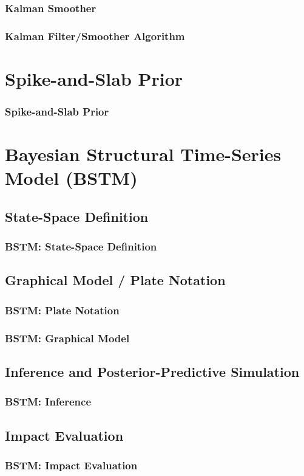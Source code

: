 \documentclass{beamer}
\begin{document}
\begin{frame}\frametitle{Kalman Smoother}

\end{frame}

\begin{frame}\frametitle{Kalman Filter/Smoother Algorithm}

\end{frame}


\section{Spike-and-Slab Prior}
\begin{frame}\frametitle{Spike-and-Slab Prior}

\end{frame}


\section{Bayesian Structural Time-Series Model (BSTM)} 
\subsection{State-Space Definition}
\begin{frame}\frametitle{BSTM: State-Space Definition}

\end{frame}

\subsection{Graphical Model / Plate Notation}
\begin{frame}\frametitle{BSTM: Plate Notation}

\end{frame}

\begin{frame}\frametitle{BSTM: Graphical Model}

\end{frame}

\subsection{Inference and Posterior-Predictive Simulation}
\begin{frame}\frametitle{BSTM: Inference}

\end{frame}

\subsection{Impact Evaluation}
\begin{frame}\frametitle{BSTM: Impact Evaluation}

\end{frame}
\end{document}
